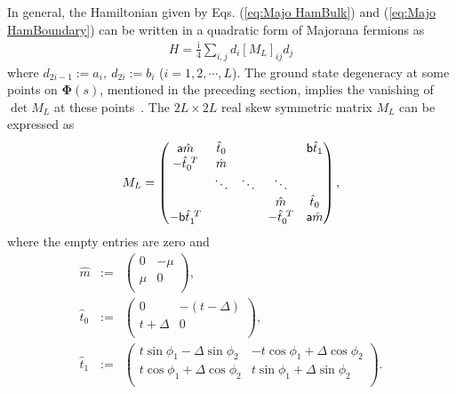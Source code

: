 \documentclass[aps, prb, showpacs, twocolumn, %
amssymb,superscriptaddress]{revtex4}
\newcommand{\ii}{\text{i}}
\begin{document}
In general, the Hamiltonian given by Eqs. (\ref{eq:Majo HamBulk}) and (\ref{eq:Majo HamBoundary}) can be written in a quadratic form of Majorana fermions as
\begin{align}
H = \frac{\ii}{4} \sum_{i,j} d_{i} \left[ M_{L} \right]_{ij} d_{j}
	\label{eq:Majo QuadraticForm}
\end{align}
where  $d_{2i-1} := a_{i},~d_{2i} := b_{i}$ ($i=1,2, \cdots, L$). The ground state degeneracy  at some points on $\mathbf{\Phi} \left( s \right)$, mentioned in the preceding section,  implies the vanishing of $\det M_{L}$ at these points~\cite{Remark_InfiniteSystem}. The $2L\times2L$ real skew symmetric matrix $M_{L}$ can be expressed as
\begin{equation} 
M_{L}=\begin{pmatrix}
	{\sf a}\hat{m} & \hat{t}_{0} & \ & \ & {\sf b}\hat{t}_{1} \\
	-{\hat{t}_{0}}^{~T} & \hat{m} & \ & \ & \ \\
	\ & \ddots & \ddots & \ddots & \ \\
	\ & \ & \ & \hat{m} & {\hat{t}_{0}} \\
	-{\sf b} {\hat{t}_{1}}^{~T} & \ & \ & -{\hat{t}_{0}}^{~T} & {\sf a} \hat{m} \\
\end{pmatrix}, 
\end{equation}
where the empty entries are zero and 
\begin{eqnarray}
\hat{m} \! &:=& \! 
\begin{pmatrix}
	0 & -\mu \\
	\mu & 0 \\
\end{pmatrix}, \\
\hat{t}_{0} \! &:=& \! 
\begin{pmatrix}
	0 & -(t-\Delta) \\
	t+\Delta & 0 \\
\end{pmatrix},\\
\hat{t}_{1} \!  &:=&\!  
\begin{pmatrix}
	t\sin\phi_{1} \!-\! \Delta\sin\phi_{2} & -t\cos\phi_{1} \!+\! \Delta\cos\phi_{2} \\
	t\cos\phi_{1} \!+\! \Delta\cos\phi_{2} & t\sin\phi_{1} \!+\! \Delta\sin\phi_{2} \\
\end{pmatrix}.
\end{eqnarray}
\end{document}
